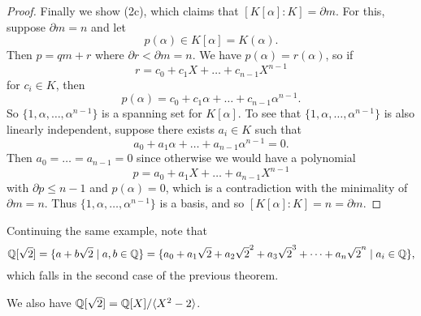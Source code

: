 \begin{proof}
  Finally we show (2c), which claims that
  $[K[\alpha] : K] = \partial m$. For this, suppose
  $\partial m = n$ and let
  \[
    p(\alpha) \in K[\alpha] = K(\alpha).
  \]
  Then $p = qm + r$ where $\partial r < \partial m = n$.
  We have $p(\alpha) = r(\alpha)$, so if
  \[
    r = c_0 + c_1 X + \dots + c_{n - 1} X^{n - 1}
  \]
  for $c_i \in K$, then
  \[
    p(\alpha) = c_0 + c_1 \alpha + \dots + c_{n - 1} \alpha^{n - 1}.
  \]
  So $\{1, \alpha, \dots, \alpha^{n - 1}\}$ is a spanning
  set for $K[\alpha]$. To see that
  $\{1, \alpha, \dots, \alpha^{n - 1}\}$ is also
  linearly independent, suppose there exists $a_i \in K$
  such that
  \[
    a_0 + a_1 \alpha + \dots + a_{n - 1} \alpha^{n - 1} = 0.
  \]
  Then $a_0 = \dots = a_{n - 1} = 0$ since otherwise
  we would have a polynomial
  \[
    p = a_0 + a_1 X + \dots + a_{n - 1} X^{n - 1}
  \]
  with $\partial p \le n - 1$ and $p(\alpha) = 0$,
  which is a contradiction with the minimality of
  $\partial m = n$. Thus
  $\{1, \alpha, \dots, \alpha^{n - 1}\}$ is a basis, and
  so $[K[\alpha] : K] = n = \partial m$.
\end{proof}

\begin{example}
  Continuing the same example, note that
  \[
    \mathbb{Q}[\sqrt{2}] = \{a + b\sqrt{2} \mid a, b \in \mathbb{Q}\}
    = \{a_0 + a_1 \sqrt{2} + a_2 \sqrt{2}^2 + a_3 \sqrt{2}^3 + \dots + a_n \sqrt{2}^n \mid a_i \in \mathbb{Q}\},
  \]
  which falls in the second case of the previous theorem.
\end{example}

\begin{remark}
  We also have $\mathbb{Q}[\sqrt{2}] = \mathbb{Q}[X] / \langle X^2 - 2 \rangle$.
\end{remark}

